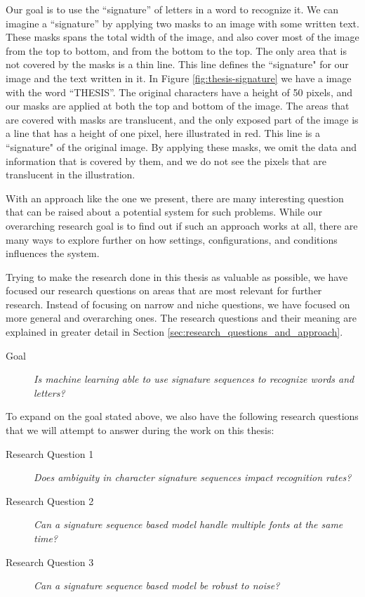 Our goal is to use the ``signature'' of letters in a word to recognize it. We can imagine a ``signature'' by applying two masks to an image with some written text. These masks spans the total width of the image, and also cover most of the image from the top to bottom, and from the bottom to the top. The only area that is not covered by the masks is a thin line. This line defines the ``signature" for our image and the text written in it. In Figure \ref{fig:thesis-signature} we have a image with the word ``THESIS''. The original characters have a height of 50 pixels, and our masks are applied at both the top and bottom of the image. The areas that are covered with masks are translucent, and the only exposed part of the image is a line that has a height of one pixel, here illustrated in red. This line is a ``signature" of the original image. By applying these masks, we omit the data and information that is covered by them, and we do not see the pixels that are translucent in the illustration.

With an approach like the one we present, there are many interesting question that can be raised about a potential system for such problems. While our overarching research goal is to find out if such an approach works at all, there are many ways to explore further on how settings, configurations, and conditions influences the system.

Trying to make the research done in this thesis as valuable as possible, we have focused our research questions on areas that are most relevant for further research. Instead of focusing on narrow and niche questions, we have focused on more general and overarching ones. The research questions and their meaning are explained in greater detail in Section \ref{sec:research_questions_and_approach}.

\begin{description}
    \item[Goal]{\textit{Is machine learning able to use signature sequences to recognize words and letters?}}
\end{description}

To expand on the goal stated above, we also have the following research questions that we will attempt to answer during the work on this thesis:

\begin{description}
    \item[Research Question 1]{\textit{Does ambiguity in character signature sequences impact recognition rates?}}
    \item[Research Question 2]{\textit{Can a signature sequence based model handle multiple fonts at the same time?}}
    \item[Research Question 3]{\textit{Can a signature sequence based model be robust to noise?}}
\end{description}

